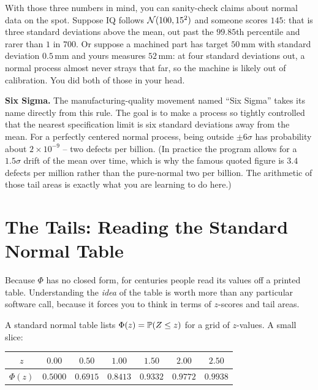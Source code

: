 \begin{intuitionbox}
With those three numbers in mind, you can sanity-check claims about normal data
on the spot. Suppose IQ follows $\Normal(100, 15^2)$ and someone scores $145$:
that is three standard deviations above the mean, out past the $99.85$th
percentile and rarer than $1$ in $700$. Or suppose a machined part has target
$50$\,mm with standard deviation $0.5$\,mm and yours measures $52$\,mm: at four
standard deviations out, a normal process almost never strays that far, so the
machine is likely out of calibration. You did both of those in your head.
\end{intuitionbox}

\begin{applicationbox}
\textbf{Six Sigma.} The manufacturing-quality movement named ``Six Sigma'' takes
its name directly from this rule. The goal is to make a process so tightly
controlled that the nearest specification limit is six standard deviations away
from the mean. For a perfectly centered normal process, being outside
$\pm 6\sigma$ has probability about $2 \times 10^{-9}$ -- two defects per billion.
(In practice the program allows for a $1.5\sigma$ drift of the mean over time,
which is why the famous quoted figure is $3.4$ defects per million rather than
the pure-normal two per billion. The arithmetic of those tail areas is exactly
what you are learning to do here.)
\end{applicationbox}

\section{The Tails: Reading the Standard Normal Table}
\label{ch12:table}

Because $\Phi$ has no closed form, for centuries people read its values off a
printed table. Understanding the \emph{idea} of the table is worth more than any
particular software call, because it forces you to think in terms of $z$-scores
and tail areas.

A standard normal table lists $\Phi(z) = \P(Z \le z)$ for a grid of
$z$-values. A small slice:

\begin{center}
\begin{tabular}{ccccccc}
\toprule
$z$ & $0.00$ & $0.50$ & $1.00$ & $1.50$ & $2.00$ & $2.50$\\
\midrule
$\Phi(z)$ & $0.5000$ & $0.6915$ & $0.8413$ & $0.9332$ & $0.9772$ & $0.9938$\\
\bottomrule
\end{tabular}
\end{center}

